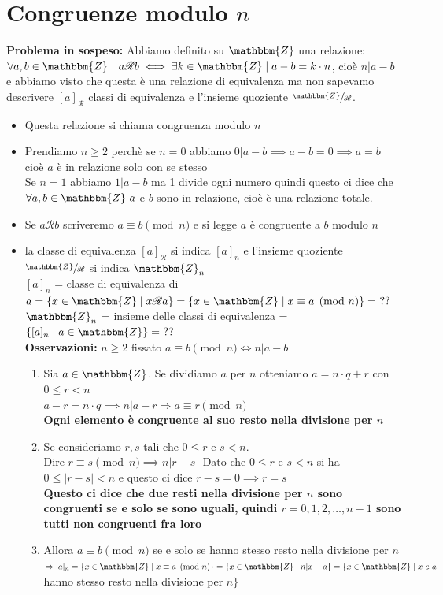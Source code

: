 \documentclass[12pt, letterpaper]{report}
\begin{document}
		\chapter{Congruenze modulo $n$}
		\textbf{Problema in sospeso:} Abbiamo definito su $\mathbbm{Z}$ una relazione: $\forall a,b \in \mathbbm{Z} \quad a\mathscr{R}b \iff \exists k \in \mathbbm{Z} \mid a - b = k \cdot n$, cioè $n|a-b$ e abbiamo visto che questa è una relazione di equivalenza ma non sapevamo descrivere $[a]_\mathscr{R}$ classi di equivalenza e l'insieme quoziente $\sfrac{\mathbbm{Z}}{\mathscr{R}}$.
		\begin{itemize}
			\item Questa relazione si chiama congruenza modulo $n$
			\item Prendiamo $n \geq 2$ perchè se $n = 0$ abbiamo $0|a-b \implies a-b=0 \implies a=b$ cioè $a$ è in relazione solo con se stesso \\
			Se $n = 1$ abbiamo $1|a-b$ ma 1 divide ogni numero quindi questo ci dice che $\forall a,b \in \mathbbm{Z}\ a$ e $b$ sono in relazione, cioè è una relazione totale.
			\item Se $a\mathscr{R}b$ scriveremo $a \equiv b \pmod{n}$ e si legge $a$ è congruente a $b$ modulo $n$
			\item la classe di equivalenza $[a]_\mathscr{R}$ si indica $[a]_n$ e l'insieme quoziente $\sfrac{\mathbbm{Z}}{\mathscr{R}}$ si indica $\mathbbm{Z}_n$ \\
			$[a]_n$ = classe di equivalenza di $a=\{x \in \mathbbm{Z} \mid x \mathscr{R} a\} = \{x \in \mathbbm{Z} \mid x \equiv a \pmod{n}\} =\ ??$ \\
			$\mathbbm{Z}_n$ = insieme delle classi di equivalenza = $\{[a]_n \mid a \in \mathbbm{Z}\} =\ ??$ \\
			\textbf{Osservazioni:} $n \geq 2$ fissato $a \equiv b \pmod{n} \iff n | a - b$
			\begin{enumerate}
				\item Sia $a \in \mathbbm{Z}$. Se dividiamo $a$ per $n$ otteniamo $a = n \cdot q + r$ con $0 \leq r < n$ \\
				$a - r = n \cdot q \implies n | a - r \Rightarrow a \equiv r \pmod{n}$ \\
				\textbf{\color{red}Ogni elemento è congruente al suo resto nella divisione per $n$}
				\item Se consideriamo $r,s$ tali che $0 \leq r$ e $s < n$. \\
				Dire $r \equiv s \pmod{n} \implies n | r - s$- Dato che $0 \leq r$ e $s < n$ si ha $0 \leq |r-s| < n$ e questo ci dice $r - s = 0 \implies r = s$ \\
				\textbf{\color{red} Questo ci dice che due resti nella divisione per $n$ sono congruenti se e solo se sono uguali, quindi $r=0,1,2,\dots,n-1$ sono tutti non congruenti fra loro}
				\item Allora $a \equiv b \pmod{n}$ se e solo se hanno stesso resto nella divisione per $n$ \\
				$\Rightarrow [a]_n = \{x \in \mathbbm{Z} \mid x \equiv a \pmod{n}\} = \{ x \in \mathbbm{Z} \mid n | x-a\} = \{x \in \mathbbm{Z} \mid x\ e\ a\ $ hanno stesso resto nella divisione per $n \}$
			\end{enumerate}
		\end{itemize}
\end{document}
